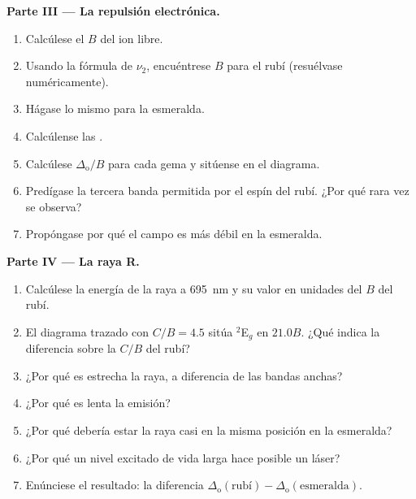 \begin{problem}
\medskip\noindent\textbf{Parte III --- La repulsión electrónica.}
\begin{enumerate}[resume]
  \item Calcúlese el $B$ del ion libre.
  \item Usando la fórmula de $\nu_2$, encuéntrese $B$ para el rubí (resuélvase numéricamente).
  \item Hágase lo mismo para la esmeralda.
  \item Calcúlense las .
  \item Calcúlese $\Delta_{\mathrm o}/B$ para cada gema y sitúense en el diagrama.
  \item Predígase la tercera banda permitida por el espín del rubí. ¿Por qué rara vez se observa?
  \item Propóngase por qué el campo es más débil en la esmeralda.
\end{enumerate}

\medskip\noindent\textbf{Parte IV --- La raya R.}
\begin{enumerate}[resume]
  \item Calcúlese la energía de la raya a \qty{695}{nm} y su valor en unidades del $B$ del rubí.
  \item El diagrama trazado con $C/B = 4.5$ sitúa $^2$E$_g$ en $21.0B$. ¿Qué indica la diferencia
        sobre la $C/B$ del rubí?
  \item ¿Por qué es estrecha la raya, a diferencia de las bandas anchas?
  \item ¿Por qué es lenta la emisión?
  \item ¿Por qué debería estar la raya casi en la misma posición en la esmeralda?
  \item ¿Por qué un nivel excitado de vida larga hace posible un láser?
  \item Enúnciese el resultado: la diferencia $\Delta_{\mathrm o}(\text{rubí}) - \Delta_{\mathrm o}(\text{esmeralda})$.
\end{enumerate}
\end{problem}
